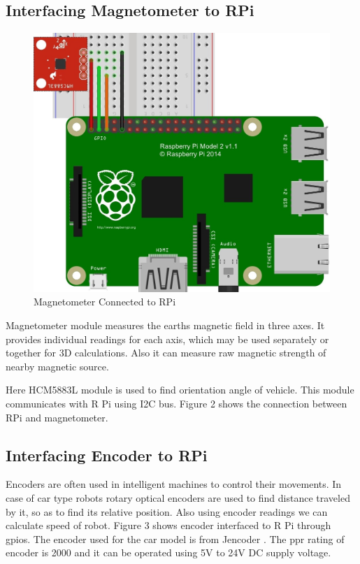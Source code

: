 \documentclass[conference]{IEEEtran}
\begin{document}
\subsection{Interfacing Magnetometer to RPi}



\begin{figure}[H]
	\centering
	\includegraphics[width=0.7\linewidth]{rpi_mag}
	\caption{Magnetometer Connected to RPi}
	\label{fig:rpi_mag}
\end{figure}

Magnetometer module measures the earths magnetic field in three axes. It provides individual readings for each axis, which may be used separately or together for 3D calculations. Also it can measure raw magnetic strength of nearby magnetic source.

Here HCM5883L module is used to find orientation angle of vehicle. This module communicates with R Pi using I2C bus. Figure 2 shows the connection between RPi and magnetometer.

\subsection{Interfacing Encoder to RPi}

Encoders are often used in intelligent machines to control their movements. In case of car type robots rotary optical encoders are used to find distance traveled by it, so as to find its relative position. Also using encoder readings we can calculate speed of robot. Figure 3 shows encoder interfaced to R Pi through gpios. The encoder used for the car model is from Jencoder \cite{paper9}. The ppr rating of encoder is 2000 and it can be operated using 5V to 24V DC supply voltage.
\end{document}
